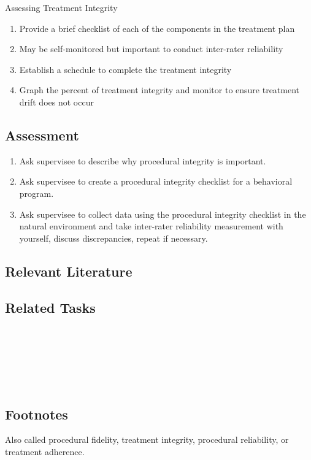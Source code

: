 Assessing Treatment Integrity
\begin{enumerate}
\item Provide a brief checklist of each of the components in the treatment plan
\item May be self-monitored but important to conduct inter-rater reliability
\item Establish a schedule to complete the treatment integrity
\item Graph the percent of treatment integrity and monitor to ensure treatment drift does not occur
\end{enumerate}
%
\subsection{Assessment}
\begin{enumerate}
\item Ask supervisee to describe why procedural integrity is important.
\item Ask supervisee to create a procedural integrity checklist for a behavioral program.
\item Ask supervisee to collect data using the procedural integrity checklist in the natural environment and take inter-rater reliability measurement with yourself, discuss discrepancies, repeat if necessary.
\end{enumerate}
%
\subsection{Relevant Literature}
\begin{refsection}
\nocite{cooper2007applied,
        johnston2010strategies,
        wolery1994procedural}
\printbibliography[heading=none]
\end{refsection} 
%                         
\subsection{Related Tasks}
\fourfOne{}\\
\fourhThree{}\\
\fourhFour{}\\
\fourkThree{}\\
\fourkFour{}\\
%
\subsection{Footnotes}
Also called procedural fidelity, treatment integrity, procedural reliability, or treatment adherence.
